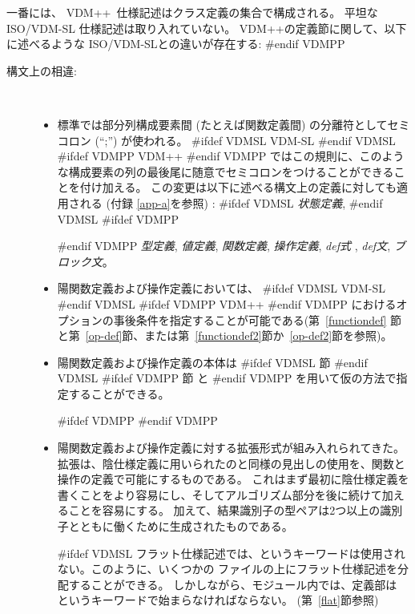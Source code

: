 \documentclass[\pformat,12pt]{jarticle}
\newcommand{\vdmslpp}[2]{%
#ifdef VDMSL
#1
#endif VDMSL
#ifdef VDMPP
#2
#endif VDMPP
}
\newcommand{\vdmsl}{VDM-SL}
\newcommand{\vdmpp}{VDM++}
\begin{document}
一番には、  \vdmpp\ 仕様記述はクラス定義の集合で構成される。
平坦な ISO/VDM-SL 仕様記述は取り入れていない。
\vdmpp の定義節に関して、以下に述べるような ISO/VDM-SLとの違いが存在する:
#endif VDMPP

\begin{description}
\item[構文上の相違:]\mbox{}\\
  \begin{itemize}
  
  \item 標準では部分列構成要素間 (たとえば関数定義間) の分離符としてセミコロン (``;'') が使われる。
  \vdmslpp{\vdmsl}{\vdmpp} ではこの規則に、このような構成要素の列の最後尾に随意でセミコロンをつけることができることを付け加える。
この変更は以下に述べる構文上の定義に対しても適用される (付録 \ref{app-a}を参照)
: \vdmslpp{{\em 状態定義},}{} {\em 型定義}, {\em 値定義},
    {\em 関数定義}, {\em 操作定義}, {\em def式
    }, {\em def文}, {\em ブロック文}。

  \item 陽関数定義および操作定義においては、 \vdmslpp{VDM-SL}{\vdmpp} におけるオプションの事後条件を指定することが可能である(第~\ref{functiondef} 節と第~\ref{op-def}節、または第~\ref{functiondef2}節か~\ref{op-def2}節を参照)。

  \item 陽関数定義および操作定義の本体は \vdmslpp{節}{節
    と}を用いて仮の方法で指定することができる。

#ifdef VDMPP
#endif VDMPP
    
  \item 陽関数定義および操作定義に対する拡張形式が組み入れられてきた。
拡張は、陰仕様定義に用いられたのと同様の見出しの使用を、関数と操作の定義で可能にするものである。
これはまず最初に陰仕様定義を書くことをより容易にし、そしてアルゴリズム部分を後に続けて加えることを容易にする。 
加えて、結果識別子の型ペアは2つ以上の識別子とともに働くために生成されたものである。

#ifdef VDMSL
  フラット仕様記述では、というキーワードは使用されない。このように、いくつかの
ファイルの上にフラット仕様記述を分配することができる。
しかしながら、モジュール内では、定義部は というキーワードで始まらなければならない。
(第~\ref{flat}節参照)


\end{itemize}
\end{description}
\end{document}
